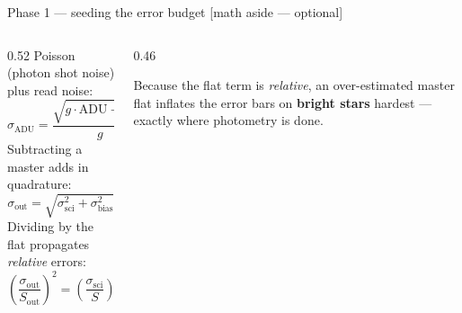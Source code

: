 \documentclass[10pt,aspectratio=169]{beamer}
\newcommand{\asidetag}{\hfill{\footnotesize\color{cassablue}[math aside --- optional]}}
\begin{document}
\begin{frame}{Phase 1 --- seeding the error budget \asidetag}
  \begin{columns}[T]
    \begin{column}{0.52\textwidth}
      Poisson (photon shot noise) plus read noise:
      \[
        \sigma_{\text{ADU}} = \frac{\sqrt{g \cdot \text{ADU} + \text{RN}^2}}{g}
      \]
      Subtracting a master adds in quadrature:
      \[
        \sigma_{\text{out}} = \sqrt{\sigma_{\text{sci}}^2 + \sigma_{\text{bias}}^2}
      \]
      Dividing by the flat propagates \emph{relative} errors:
      \[
        \left(\frac{\sigma_{\text{out}}}{S_{\text{out}}}\right)^2 =
        \left(\frac{\sigma_{\text{sci}}}{S}\right)^2 +
        \left(\frac{\sigma_{\text{flat}}}{F}\right)^2
      \]
    \end{column}
    \begin{column}{0.46\textwidth}
      \centering

      \vspace{0.4em}
      {\tiny Because the flat term is \emph{relative}, an over-estimated master flat
      inflates the error bars on \textbf{bright stars} hardest --- exactly where
      photometry is done.}
    \end{column}
  \end{columns}
\end{frame}

\end{document}
